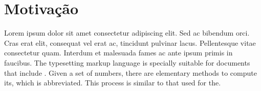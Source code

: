 \documentclass[./main.tex]{subfiles}
\begin{document}
\chapter{Motivação}
\par Lorem ipsum dolor sit amet consectetur adipiscing elit. Sed ac bibendum orci. Cras erat elit, consequat vel erat ac, tincidunt pulvinar lacus. Pellentesque vitae consectetur quam. Interdum et malesuada fames ac ante ipsum primis in faucibus. The typesetting markup language is specially suitable for documents that include . Given a set of numbers, there are elementary methods to compute its, which is abbreviated. This process is similar to that used for the.
\end{document}
